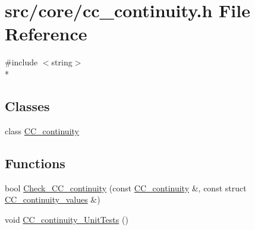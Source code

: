 \hypertarget{a00202}{\section{src/core/cc\-\_\-continuity.h File Reference}
\label{a00202}
}
{\ttfamily \#include $<$string$>$}\\*
\subsection*{Classes}
\begin{DoxyCompactItemize}
\item 
class \hyperlink{a00027}{C\-C\-\_\-continuity}
\end{DoxyCompactItemize}
\subsection*{Functions}
\begin{DoxyCompactItemize}
\item 
bool \hyperlink{a00202_ac961436b35c4fb9e497123dcea1a21e6}{Check\-\_\-\-C\-C\-\_\-continuity} (const \hyperlink{a00027}{C\-C\-\_\-continuity} \&, const struct \hyperlink{a00028}{C\-C\-\_\-continuity\-\_\-values} \&)
\item 
void \hyperlink{a00202_a8daadaacfcc6d54a48f7853fe864bc46}{C\-C\-\_\-continuity\-\_\-\-Unit\-Tests} ()
\end{DoxyCompactItemize}


